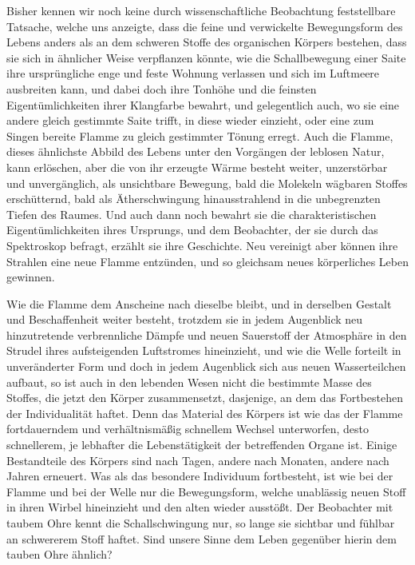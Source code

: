 \documentclass[a4paper, 11pt, oneside, german]{article}
\begin{document}
Bisher kennen wir noch keine durch wissenschaftliche Beobachtung feststellbare Tatsache, welche uns anzeigte, dass die feine und verwickelte Bewegungsform des Lebens anders als an dem schweren Stoffe des organischen Körpers bestehen, dass sie sich in ähnlicher Weise verpflanzen könnte, wie die Schallbewegung einer Saite ihre ursprüngliche enge und feste Wohnung verlassen und sich im Luftmeere ausbreiten kann, und dabei doch ihre Tonhöhe und die feinsten Eigentümlichkeiten ihrer Klangfarbe bewahrt, und gelegentlich auch, wo sie eine andere gleich gestimmte Saite trifft, in diese wieder einzieht, oder eine zum Singen bereite Flamme zu gleich gestimmter Tönung erregt. Auch die Flamme, dieses ähnlichste Abbild des Lebens unter den Vorgängen der leblosen Natur, kann erlöschen, aber die von ihr erzeugte Wärme besteht weiter, unzerstörbar und unvergänglich, als unsichtbare Bewegung, bald die Molekeln wägbaren Stoffes erschütternd, bald als Ätherschwingung hinausstrahlend in die unbegrenzten Tiefen des Raumes. Und auch dann noch bewahrt sie die charakteristischen Eigentümlichkeiten ihres Ursprungs, und dem Beobachter, der sie durch das Spektroskop befragt, erzählt sie ihre Geschichte. Neu vereinigt aber können ihre Strahlen eine neue Flamme entzünden, und so gleichsam neues körperliches Leben gewinnen.

Wie die Flamme dem Anscheine nach dieselbe bleibt, und in derselben Gestalt und Beschaffenheit weiter besteht, trotzdem sie in jedem Augenblick neu hinzutretende verbrennliche Dämpfe und neuen Sauerstoff der Atmosphäre in den Strudel ihres aufsteigenden Luftstromes hineinzieht, und wie die Welle forteilt in unveränderter Form und doch in jedem Augenblick sich aus neuen Wasserteilchen aufbaut, so ist auch in den lebenden Wesen nicht die bestimmte Masse des Stoffes, die jetzt den Körper zusammensetzt, dasjenige, an dem das Fortbestehen der Individualität haftet. Denn das Material des Körpers ist wie das der Flamme fortdauerndem und verhältnismäßig schnellem Wechsel unterworfen, desto schnellerem, je lebhafter die Lebenstätigkeit der betreffenden Organe ist. Einige Bestandteile des Körpers sind nach Tagen, andere nach Monaten, andere nach Jahren erneuert. Was als das besondere Individuum fortbesteht, ist wie bei der Flamme und bei der Welle nur die Bewegungsform, welche unablässig neuen Stoff in ihren Wirbel hineinzieht und den alten wieder ausstößt. Der Beobachter mit taubem Ohre kennt die Schallschwingung nur, so lange sie sichtbar und fühlbar an schwererem Stoff haftet. Sind unsere Sinne dem Leben gegenüber hierin dem tauben Ohre ähnlich?
\clearpage
\end{document}
